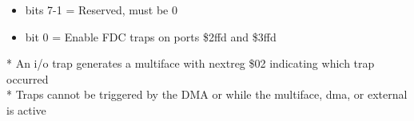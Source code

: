 \begin{itemize}
\item bits 7-1 = Reserved, must be 0
\item bit 0 = Enable FDC traps on ports \$2ffd and \$3ffd
\end{itemize}
* An i/o trap generates a multiface  with nextreg \$02
  indicating which trap occurred\\
* Traps cannot be triggered by the DMA or while the multiface, dma, or
 external  is active
